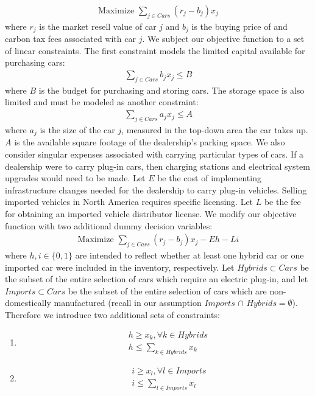 \documentclass{article}
\begin{document}
\begin{align*}
    \text{Maximize } \sum_{j\in Cars} (r_j - b_j)x_j 
\end{align*}
where $r_j$ is the market resell value of car $j$ and $b_j$ is the buying price of and carbon tax fees associated with car $j$. We subject our objective function to a set of linear constraints. The first constraint models the limited capital available for purchasing cars:
    \begin{align*}
      \sum_{j\in Cars} b_jx_j\leq B
    \end{align*}
where $B$ is the budget for purchasing and storing cars. The storage space is also limited and must be modeled as another constraint:
    \begin{align*}
    \sum_{j\in Cars} a_jx_j\leq A
    \end{align*}
where $a_j$ is the size of the car $j$, measured in the top-down area the car takes up. $A$ is the available square footage of the dealership's parking space. We also consider singular expenses associated with carrying particular types of cars. If a dealership were to carry plug-in cars, then charging stations and electrical system upgrades would need to be made. Let $E$ be the cost of implementing infrastructure changes needed for the dealership to carry plug-in vehicles. Selling imported vehicles in North America requires specific licensing. Let $L$ be the fee for obtaining an imported vehicle distributor license. We modify our objective function with two additional dummy decision variables:
\begin{align*}
    \text{Maximize } \sum_{j\in Cars} (r_j - b_j)x_j - Eh - Li
\end{align*}
where $h, i \in \{0,1\}$ are intended to reflect whether at least one hybrid car or one imported car were included in the inventory, respectively. Let $Hybrids \subset Cars$ be the subset of the entire selection of cars which require an electric plug-in, and let $Imports \subset Cars$ be the subset of the entire selection of cars which are non-domestically manufactured (recall in our assumption $Imports$ $\cap$ $Hybrids= \emptyset$). Therefore we introduce two additional sets of constraints:
\begin{enumerate}
    \item \begin{align*}
            &h \geq x_k, \forall k \in Hybrids\ \\
            &h \leq \sum_{k\in Hybrids}x_k
           \end{align*}
    \item \begin{align*}
            &i \geq x_l, \forall l \in Imports \\
            &i \leq \sum_{l\in Imports}x_l
           \end{align*}
\end{enumerate}
\end{document}
